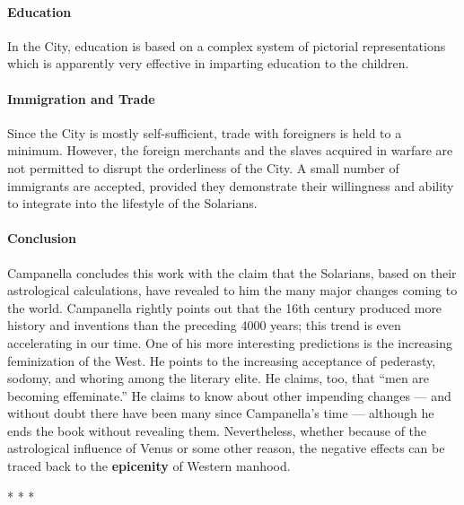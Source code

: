 \paragraph{Education}


In the City, education is based on a complex system of pictorial representations which is apparently very effective in imparting education to the children.

\paragraph{Immigration and Trade}


Since the City is mostly self-sufficient, trade with foreigners is held to a minimum. However, the foreign merchants and the slaves acquired in warfare are not permitted to disrupt the orderliness of the City. A small number of immigrants are accepted, provided they demonstrate their willingness and ability to integrate into the lifestyle of the Solarians.

\paragraph{Conclusion}


Campanella concludes this work with the claim that the Solarians, based on their astrological calculations, have revealed to him the many major changes coming to the world. Campanella rightly points out that the 16th century produced more history and inventions than the preceding 4000 years; this trend is even accelerating in our time. One of his more interesting predictions is the increasing feminization of the West. He points to the increasing acceptance of pederasty, sodomy, and whoring among the literary elite. He claims, too, that ``men are becoming effeminate.'' He claims to know about other impending changes --- and without doubt there have been many since Campanella's time --- although he ends the book without revealing them. Nevertheless, whether because of the astrological influence of Venus or some other reason, the negative effects can be traced back to the \textbf{epicenity} of Western manhood.



\begin{center}* * *\end{center}

